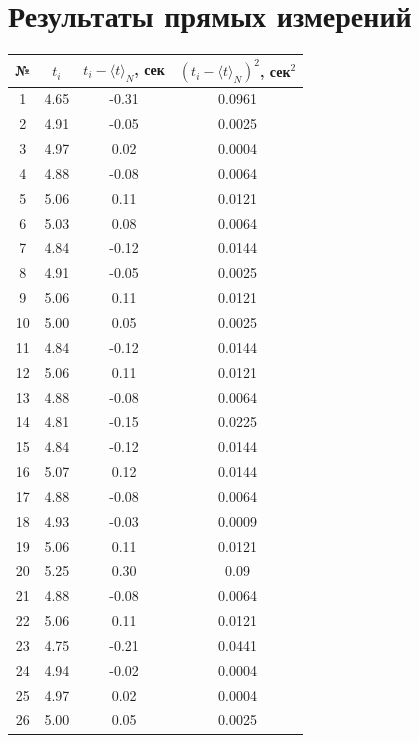 \documentclass[12pt,a4paper]{article}
\begin{document}
\section{Результаты прямых измерений}
\begin{longtable}{|c|c|c|c|}
    \hline
    № & $t_i$ & $t_i-\langle t\rangle_N$, сек & $(t_i-\langle t\rangle_N)^2$, сек$^2$\\
    \hline
    1 & 4.65 & -0.31 & 0.0961 \\
    \hline
    2 & 4.91 & -0.05 & 0.0025 \\
    \hline
    3 & 4.97 & 0.02 & 0.0004 \\
    \hline
    4 & 4.88 & -0.08 & 0.0064 \\
    \hline
    5 & 5.06 & 0.11 & 0.0121 \\
    \hline
    6 & 5.03 & 0.08 & 0.0064 \\
    \hline
    7 & 4.84 & -0.12 & 0.0144 \\
    \hline
    8 & 4.91 & -0.05 & 0.0025 \\
    \hline
    9 & 5.06 & 0.11 & 0.0121 \\
    \hline
    10 & 5.00 & 0.05 & 0.0025 \\
    \hline
    11 & 4.84 & -0.12 & 0.0144 \\
    \hline
    12 & 5.06 & 0.11 & 0.0121 \\
    \hline
    13 & 4.88 & -0.08 & 0.0064 \\
    \hline
    14 & 4.81 & -0.15 & 0.0225 \\
    \hline
    15 & 4.84 & -0.12 & 0.0144 \\
    \hline
    16 & 5.07 & 0.12 & 0.0144 \\
    \hline
    17 & 4.88 & -0.08 & 0.0064 \\
    \hline
    18 & 4.93 & -0.03 & 0.0009 \\
    \hline
    19 & 5.06 & 0.11 & 0.0121 \\
    \hline
    20 & 5.25 & 0.30 & 0.09 \\
    \hline
    21 & 4.88 & -0.08 & 0.0064 \\
    \hline
    22 & 5.06 & 0.11 & 0.0121 \\
    \hline
    23 & 4.75 & -0.21 & 0.0441 \\
    \hline
    24 & 4.94 & -0.02 & 0.0004 \\
    \hline
    25 & 4.97 & 0.02 & 0.0004 \\
    \hline
    26 & 5.00 & 0.05 & 0.0025 \\
    \hline

\end{longtable}
\end{document}

